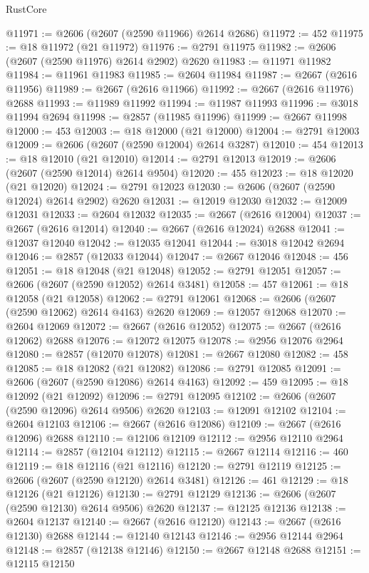 \begin{lexlean}{RustCore}
\begin{coremodule}
@11971 := @2606 (@2607 (@2590 @11966) @2614 @2686)
@11972 := 452
@11975 := @18 @11972 (@21 @11972)
@11976 := @2791 @11975
@11982 := @2606 (@2607 (@2590 @11976) @2614 @2902) @2620
@11983 := @11971 @11982
@11984 := @11961 @11983
@11985 := @2604 @11984
@11987 := @2667 (@2616 @11956)
@11989 := @2667 (@2616 @11966)
@11992 := @2667 (@2616 @11976) @2688
@11993 := @11989 @11992
@11994 := @11987 @11993
@11996 := @3018 @11994 @2694
@11998 := @2857 (@11985 @11996)
@11999 := @2667 @11998
@12000 := 453
@12003 := @18 @12000 (@21 @12000)
@12004 := @2791 @12003
@12009 := @2606 (@2607 (@2590 @12004) @2614 @3287)
@12010 := 454
@12013 := @18 @12010 (@21 @12010)
@12014 := @2791 @12013
@12019 := @2606 (@2607 (@2590 @12014) @2614 @9504)
@12020 := 455
@12023 := @18 @12020 (@21 @12020)
@12024 := @2791 @12023
@12030 := @2606 (@2607 (@2590 @12024) @2614 @2902) @2620
@12031 := @12019 @12030
@12032 := @12009 @12031
@12033 := @2604 @12032
@12035 := @2667 (@2616 @12004)
@12037 := @2667 (@2616 @12014)
@12040 := @2667 (@2616 @12024) @2688
@12041 := @12037 @12040
@12042 := @12035 @12041
@12044 := @3018 @12042 @2694
@12046 := @2857 (@12033 @12044)
@12047 := @2667 @12046
@12048 := 456
@12051 := @18 @12048 (@21 @12048)
@12052 := @2791 @12051
@12057 := @2606 (@2607 (@2590 @12052) @2614 @3481)
@12058 := 457
@12061 := @18 @12058 (@21 @12058)
@12062 := @2791 @12061
@12068 := @2606 (@2607 (@2590 @12062) @2614 @4163) @2620
@12069 := @12057 @12068
@12070 := @2604 @12069
@12072 := @2667 (@2616 @12052)
@12075 := @2667 (@2616 @12062) @2688
@12076 := @12072 @12075
@12078 := @2956 @12076 @2964
@12080 := @2857 (@12070 @12078)
@12081 := @2667 @12080
@12082 := 458
@12085 := @18 @12082 (@21 @12082)
@12086 := @2791 @12085
@12091 := @2606 (@2607 (@2590 @12086) @2614 @4163)
@12092 := 459
@12095 := @18 @12092 (@21 @12092)
@12096 := @2791 @12095
@12102 := @2606 (@2607 (@2590 @12096) @2614 @9506) @2620
@12103 := @12091 @12102
@12104 := @2604 @12103
@12106 := @2667 (@2616 @12086)
@12109 := @2667 (@2616 @12096) @2688
@12110 := @12106 @12109
@12112 := @2956 @12110 @2964
@12114 := @2857 (@12104 @12112)
@12115 := @2667 @12114
@12116 := 460
@12119 := @18 @12116 (@21 @12116)
@12120 := @2791 @12119
@12125 := @2606 (@2607 (@2590 @12120) @2614 @3481)
@12126 := 461
@12129 := @18 @12126 (@21 @12126)
@12130 := @2791 @12129
@12136 := @2606 (@2607 (@2590 @12130) @2614 @9506) @2620
@12137 := @12125 @12136
@12138 := @2604 @12137
@12140 := @2667 (@2616 @12120)
@12143 := @2667 (@2616 @12130) @2688
@12144 := @12140 @12143
@12146 := @2956 @12144 @2964
@12148 := @2857 (@12138 @12146)
@12150 := @2667 @12148 @2688
@12151 := @12115 @12150

\end{coremodule}
\end{lexlean}

